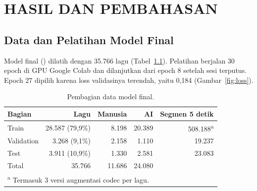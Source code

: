 \chapter{HASIL DAN PEMBAHASAN}

\section{Data dan Pelatihan Model Final}
Model final () dilatih dengan 35.766 lagu (Tabel~\ref{tab:data-final}). Pelatihan berjalan 30 epoch di GPU Google Colab dan dilanjutkan dari epoch 8 setelah sesi terputus. Epoch 27 dipilih karena loss validasinya terendah, yaitu 0,184 (Gambar~\ref{fig:loss}).

\begin{table}[htbp]
\centering
\singlespacing\small
\caption{Pembagian data model final.}
\label{tab:data-final}
\begin{tabular}{lrrrr}
\toprule
Bagian & Lagu & Manusia & AI & Segmen 5 detik\\
\midrule
Train & 28.587 (79,9\%) & 8.198 & 20.389 & 508.188\textsuperscript{a}\\
Validation & 3.268 (9,1\%) & 2.158 & 1.110 & 19.237\\
Test & 3.911 (10,9\%) & 1.330 & 2.581 & 23.083\\
\midrule
Total & 35.766 & 11.686 & 24.080 & \\
\bottomrule
\multicolumn{5}{l}{\footnotesize \textsuperscript{a} Termasuk 3 versi augmentasi codec per lagu.}
\end{tabular}
\end{table}

